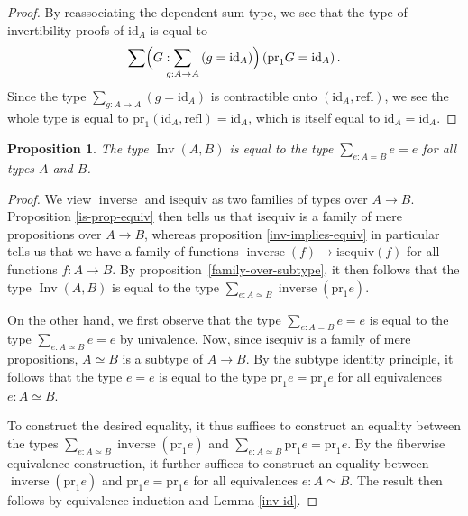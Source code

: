 \documentclass{article}
\theoremstyle{plain}
\newtheorem{proposition}[theorem]{Proposition}
\theoremstyle{definition}
\theoremstyle{remark}
\newcommand{\id}{\mathrm{id}}
\newcommand{\isequiv}{\mathrm{isequiv}}
\newcommand{\pr}{\mathrm{pr}}
\newcommand{\refl}{\mathrm{refl}}
\DeclareMathOperator{\inv}{Inv}
\DeclareMathOperator{\inverse}{inverse}
\begin{document}
\begin{proof}
  By reassociating the dependent sum type, we see that the type of invertibility proofs of
  \(\id_{A}\) is equal to
  \[\sum \Bigl(G : \hspace{-6pt} \sum_{g : A \to A} \left(g = \id_{A}\right)\Bigr)
    \left( \pr_{1}G = \id_{A}\right).\]
  Since the type \(\sum_{g : A \to A}\left(g = \id_{A}\right)\) is contractible onto
  \(\left(\id_{A}, \refl\right)\), we see the whole type is equal to
  \(\pr_{1}\left(\id_{A}, \refl\right) = \id_{A}\), which is itself equal to
  \(\id_{A} = \id_{A}\).
\end{proof}

\pagebreak

\begin{proposition}
  \label{inv-is-looped-equiv}
  The type \(\inv(A, B)\) is equal to the type \(\sum_{e : A = B} e = e\)
  for all types \(A\) and \(B\).
\end{proposition}

\begin{proof}
  We view \(\inverse\) and \(\isequiv\) as two families of types over \(A \to B\).
  Proposition \ref{is-prop-equiv} then tells us that \(\isequiv\) is a family
  of mere propositions over \(A \to B\), whereas proposition \ref{inv-implies-equiv} in
  particular tells us that we have a family of functions \(\inverse(f) \to \isequiv(f)\) for
  all functions \(f : A \to B\). By proposition~\ref{family-over-subtype}, it then follows
  that the type \(\inv(A, B)\) is equal to the type
  \(\sum_{e : A \simeq B} \inverse(\pr_{1}e)\).

  On the other hand, we first observe that the type \(\sum_{e : A = B} e = e\) is equal to the
  type \(\sum_{e : A \simeq B} e = e\) by univalence. Now, since \(\isequiv\)
  is a family of mere propositions, \(A \simeq B\) is
  a subtype of \(A \to B\). By the subtype identity principle, it follows that the type
  \(e = e\) is equal to the type \(\pr_{1}e = \pr_{1}e\) for all equivalences
  \(e : A \simeq B\).

  To construct the desired equality, it thus suffices to construct an equality between the
  types \(\sum_{e : A \simeq B} \inverse(\pr_{1}e)\) and
  \(\sum_{e : A \simeq B} \pr_{1}e = \pr_{1}e\). By the fiberwise
  equivalence construction, it further suffices to construct an equality between
  \(\inverse(\pr_{1}e)\) and \(\pr_{1}e = \pr_{1}e\) for all equivalences \(e : A \simeq B\).
  The result then follows by equivalence induction and Lemma \ref{inv-id}.
\end{proof}
\end{document}
